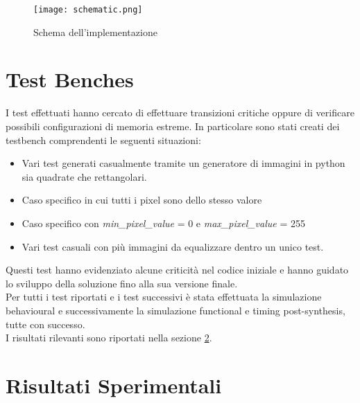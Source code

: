 \documentclass{article}
\begin{document}
\vspace*{1cm}


\begin{figure}[h!]
    \centering
    \texttt{[image: schematic.png]}
    \caption{Schema dell'implementazione}
    \label{fig:schematic}
\end{figure}


\section{Test Benches}
\label{test}

I test effettuati hanno cercato di effettuare transizioni critiche oppure di verificare possibili configurazioni di memoria estreme. In particolare sono stati creati dei testbench
comprendenti le seguenti situazioni:

\begin{itemize}
\item Vari test generati casualmente tramite un generatore di immagini in python sia quadrate che rettangolari.
\item Caso specifico in cui tutti i pixel sono dello stesso valore
\item Caso specifico con \textit{min\_pixel\_value} = 0 e \textit{max\_pixel\_value} = 255
\item Vari test casuali con più immagini da equalizzare dentro un unico test.
\end{itemize}

Questi test hanno evidenziato alcune criticità nel codice iniziale e hanno guidato lo sviluppo della soluzione fino alla sua versione finale.\\

Per tutti i test riportati e i test successivi è stata effettuata la simulazione behavioural e successivamente la simulazione functional e timing post-synthesis, tutte con successo.\\

I risultati rilevanti sono riportati nella sezione \ref{risultati}.

\section{Risultati Sperimentali}
\label{risultati}
\end{document}
